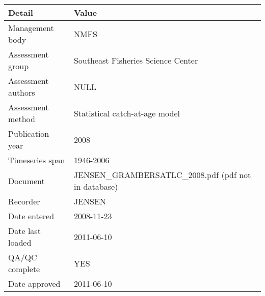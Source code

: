 \begin{table}[htb]
\centering
\begin{tabular}{lp{7cm}}
\toprule
Detail & Value \\
\midrule
Management body    & NMFS                                                 \\
Assessment group   & Southeast Fisheries Science Center                   \\
Assessment authors & NULL                                                 \\
Assessment method  & Statistical catch-at-age model                       \\
Publication year   & 2008                                                 \\
Timeseries span    & 1946-2006                                            \\
Document           & JENSEN\_GRAMBERSATLC\_2008.pdf (pdf not in database) \\
Recorder           & JENSEN                                               \\
Date entered       & 2008-11-23                                           \\
Date last loaded   & 2011-06-10                                           \\
QA/QC complete     & YES                                                  \\
Date approved      & 2011-06-10                                           \\
\bottomrule
\end{tabular}
\label{tab:assessdet}
\end{table}
